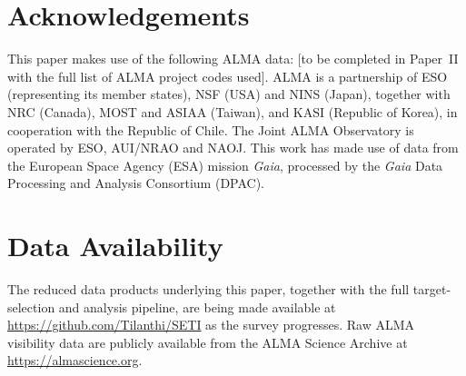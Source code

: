 \documentclass{openjournal}
\begin{document}
\section*{Acknowledgements}
This paper makes use of the following ALMA data: [to be completed in Paper~II
with the full list of ALMA project codes used]. ALMA is a partnership of ESO
(representing its member states), NSF (USA) and NINS (Japan), together with NRC
(Canada), MOST and ASIAA (Taiwan), and KASI (Republic of Korea), in cooperation
with the Republic of Chile. The Joint ALMA Observatory is operated by ESO,
AUI/NRAO and NAOJ. This work has made use of data from the European Space
Agency (ESA) mission {\it Gaia}, processed by the {\it Gaia} Data Processing and
Analysis Consortium (DPAC).

\section*{Data Availability}
The reduced data products underlying this paper, together with the full
target-selection and analysis pipeline, are being made available at
\url{https://github.com/Tilanthi/SETI} as the survey progresses. Raw ALMA
visibility data are publicly available from the ALMA Science Archive at
\url{https://almascience.org}.
\end{document}

